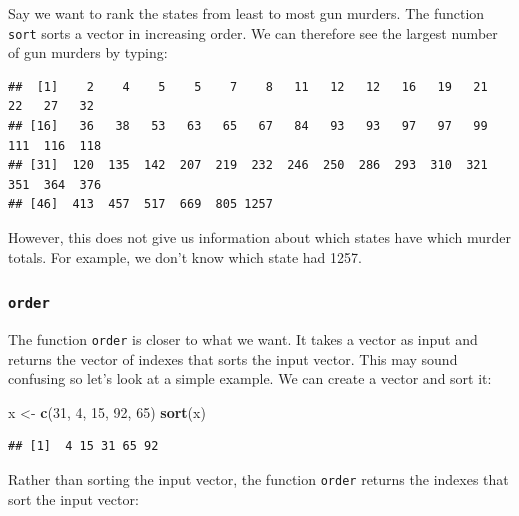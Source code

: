 \documentclass[
]{article}
\newenvironment{Shaded}{\begin{snugshade}}{\end{snugshade}}
\newcommand{\DecValTok}[1]{\textcolor[rgb]{0.00,0.00,0.81}{#1}}
\newcommand{\FunctionTok}[1]{\textcolor[rgb]{0.13,0.29,0.53}{\textbf{#1}}}
\newcommand{\NormalTok}[1]{#1}
\newcommand{\OtherTok}[1]{\textcolor[rgb]{0.56,0.35,0.01}{#1}}
\newcommand{\SpecialCharTok}[1]{\textcolor[rgb]{0.81,0.36,0.00}{\textbf{#1}}}
\begin{document}
Say we want to rank the states from least to most gun murders. The
function \texttt{sort} sorts a vector in increasing order. We can
therefore see the largest number of gun murders by typing:

\begin{Shaded}
\end{Shaded}

\begin{verbatim}
##  [1]    2    4    5    5    7    8   11   12   12   16   19   21   22   27   32
## [16]   36   38   53   63   65   67   84   93   93   97   97   99  111  116  118
## [31]  120  135  142  207  219  232  246  250  286  293  310  321  351  364  376
## [46]  413  457  517  669  805 1257
\end{verbatim}

However, this does not give us information about which states have which
murder totals. For example, we don't know which state had 1257.

\subsubsection{\texorpdfstring{\texttt{order}}{order}}\label{order}

The function \texttt{order} is closer to what we want. It takes a vector
as input and returns the vector of indexes that sorts the input vector.
This may sound confusing so let's look at a simple example. We can
create a vector and sort it:

\begin{Shaded}
\begin{Highlighting}[]
\NormalTok{x }\OtherTok{\textless{}{-}} \FunctionTok{c}\NormalTok{(}\DecValTok{31}\NormalTok{, }\DecValTok{4}\NormalTok{, }\DecValTok{15}\NormalTok{, }\DecValTok{92}\NormalTok{, }\DecValTok{65}\NormalTok{)}
\FunctionTok{sort}\NormalTok{(x)}
\end{Highlighting}
\end{Shaded}

\begin{verbatim}
## [1]  4 15 31 65 92
\end{verbatim}

Rather than sorting the input vector, the function \texttt{order}
returns the indexes that sort the input vector:
\end{document}
